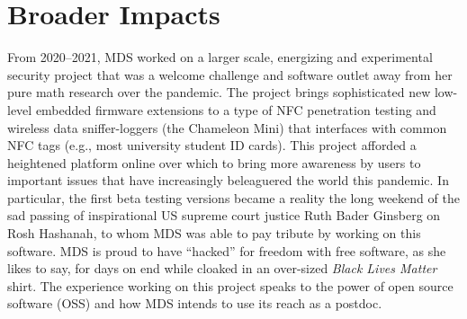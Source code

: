 \documentclass[10pt,reqno,letterpaper]{article}
\theoremstyle{plain}
\numberwithin{theorem}{section}
\theoremstyle{definition}
\begin{document}
\section{Broader Impacts}

\label{subSection_TributeToRBG_DESFire} 

From 2020--2021, MDS worked on a larger scale, energizing and experimental 
security project that was a welcome challenge and software outlet away 
from her pure math research over the pandemic. 
The project brings sophisticated new 
low-level embedded firmware extensions to a type of NFC penetration testing and 
wireless data sniffer-loggers 
(the Chameleon Mini) that interfaces with common NFC tags (e.g., most university student ID cards). 
This project afforded a heightened platform online 
over which to bring 
more awareness by users to important issues 
that have increasingly beleaguered the world this pandemic. 
In particular, the first beta testing versions became a reality 
the long weekend of the sad passing of inspirational 
US supreme court justice Ruth Bader Ginsberg on 
Rosh Hashanah, to whom MDS was able to pay tribute by working on this software. 
MDS is proud to have ``hacked'' for freedom with free software, as she likes to say, for days on end 
while cloaked in an over-sized \emph{Black Lives Matter} shirt. 
The experience working on this project speaks to the power of 
open source software (OSS) and how MDS intends to use its reach as a postdoc. 
\end{document}
